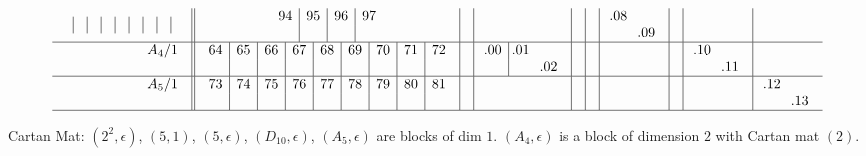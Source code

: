 \documentclass[12pt,a4paper]{amsart}
\begin{document}
\begin{align*}
\begin{array}{r||c|c|c|c|c|c|c|c|c}
\begin{array}{c|c|c|c|c|c|c|c|c}
&&&&&&&&\\
  \end{array}
&
   \begin{array}{c|c|c|c}
94&95&96&97\\
&&&\\
   \end{array}
&&&&&
    \begin{array}{cc}
\llap.08&\\
&\llap.09\\
    \end{array}
&& \\\hline
    \begin{array}{r}
      A_4/1 \\ \\
    \end{array}
&
  \begin{array}{c|c|c|c|c|c|c|c|c}
64&65&66&67&68&69&70&71&72\\
&&&&&&&&\\
  \end{array}
&&
    \begin{array}{c|cc}
\llap.00&\llap.01&\\
&&\llap.02\\
    \end{array}
&&&&&
    \begin{array}{cc}
\llap.10&\\
&\llap.11\\
    \end{array}
& \\\hline
    \begin{array}{r}
      A_5/1 \\ \\
    \end{array}
&
  \begin{array}{c|c|c|c|c|c|c|c|c}
73&74&75&76&77&78&79&80&81\\
&&&&&&&&\\
  \end{array}
&&&&&&&&
    \begin{array}{cc}
\llap.12&\\
&\llap.13\\
    \end{array}
 \\\hline
  \end{array}
\end{align*}

\newpage
\normalsize {}
Cartan Mat:  $(2^2,\epsilon)$, $(5,1)$, $(5,\epsilon)$, $(D_{10},\epsilon)$, $(A_5,\epsilon)$ are blocks of dim $1$. $(A_4, \epsilon)$ is a block of dimension $2$ with Cartan mat $(2)$.
\end{document}
